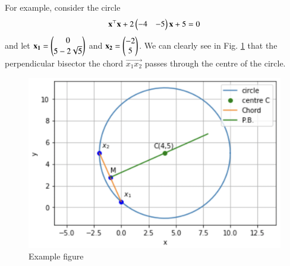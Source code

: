 For example, consider the circle
\begin{align}
    \mathbf{x}^\top\mathbf{x}+2\begin{pmatrix}-4&-5\end{pmatrix}\mathbf{x}+5=0
\end{align}
and let $\mathbf{x_1}=\begin{pmatrix}0\\5-2\sqrt{5}\end{pmatrix}$ and $\mathbf{x_2}=\begin{pmatrix}-2\\5\end{pmatrix}$.
We can clearly see in Fig.     \ref{rams/4/2/21/fig} that the perpendicular bisector the chord $\vec{x_1x_2}$ passes through the centre of the circle.

\begin{figure}[h!]
    \centering
    \includegraphics[width=\columnwidth]{solutions/4/2/21/figures/example_figure.png}
    \caption{Example figure}
    \label{rams/4/2/21/fig}
\end{figure}


